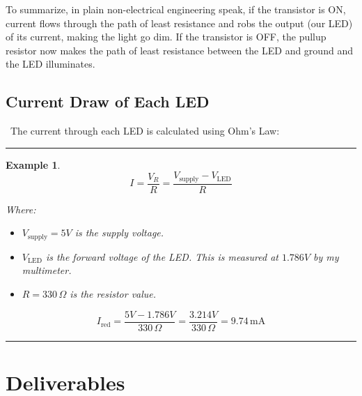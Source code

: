 \documentclass[12pt]{report}
\newtheorem{example}{Example}
\newenvironment{examp}
{\vspace{0.5cm}
\hrule
\begin{example}}
{\hrule
\vspace{0.5cm}
\end{example}}
\begin{document}
To summarize, in plain non-electrical engineering speak, if the transistor is ON, current flows through the path of least resistance and robs the output (our LED) of its current, making the light go dim. If the transistor is OFF, the pullup resistor now makes the path of least resistance between the LED and ground and the LED illuminates.
\subsection*{Current Draw of Each LED} \
The current through each LED is calculated using Ohm's Law:
\begin{examp}
	\[
		I = \frac{V_{R}}{R} = \frac{V_{\text{supply}} - V_{\text{LED}}}{R}
	\]

	Where:
	\begin{itemize}
		\item \( V_{\text{supply}} = 5V \) is the supply voltage.
		\item \( V_{\text{LED}} \) is the forward voltage of the LED.
		      This is measured at \(1.786V\) by my multimeter.
		\item \( R = 330 \, \Omega \) is the resistor value.
	\end{itemize}
	\[
		I_{\text{red}} = \frac{5V - 1.786V}{330 \, \Omega} = \frac{3.214V}{330 \, \Omega} = 9.74 \, \text{mA}
	\]
\end{examp}
\pagebreak
\section*{Deliverables}
\end{document}
